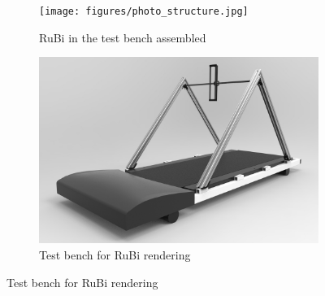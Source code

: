 \begin{figure}[ht!]
    \centering
    \begin{subfigure}[b]{0.49\textwidth}
        \texttt{[image: figures/photo\_structure.jpg]}
        \caption{RuBi in the test bench assembled}
        \label{fig:photo_structure}
    \end{subfigure}
    \begin{subfigure}[b]{0.49\textwidth}
        \includegraphics[width=\textwidth]{figures/legs_structure.jpg}
        \caption{Test bench for RuBi rendering}
        \label{fig:legs_structure}
    \end{subfigure}
\end{figure}  


